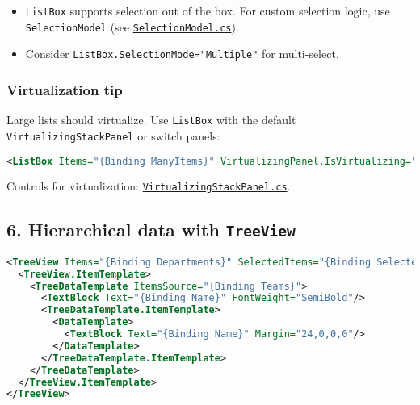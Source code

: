 \begin{itemize}
\tightlist
\item
  \passthrough{\lstinline!ListBox!} supports selection out of the box.
  For custom selection logic, use
  \passthrough{\lstinline!SelectionModel!} (see
  \href{https://github.com/AvaloniaUI/Avalonia/blob/master/src/Avalonia.Controls/Selection/SelectionModel.cs}{\passthrough{\lstinline!SelectionModel.cs!}}).
\item
  Consider \passthrough{\lstinline!ListBox.SelectionMode="Multiple"!}
  for multi-select.
\end{itemize}

\subsubsection{Virtualization tip}\label{virtualization-tip}

Large lists should virtualize. Use \passthrough{\lstinline!ListBox!}
with the default \passthrough{\lstinline!VirtualizingStackPanel!} or
switch panels:

\begin{lstlisting}[language=XML]
<ListBox Items="{Binding ManyItems}" VirtualizingPanel.IsVirtualizing="True" VirtualizingPanel.CacheLength="2"/>
\end{lstlisting}

Controls for virtualization:
\href{https://github.com/AvaloniaUI/Avalonia/blob/master/src/Avalonia.Controls/VirtualizingStackPanel.cs}{\passthrough{\lstinline!VirtualizingStackPanel.cs!}}.

\subsection{\texorpdfstring{6. Hierarchical data with
\texttt{TreeView}}{6. Hierarchical data with TreeView}}\label{hierarchical-data-with-treeview}

\begin{lstlisting}[language=XML]
<TreeView Items="{Binding Departments}" SelectedItems="{Binding SelectedDepartments}">
  <TreeView.ItemTemplate>
    <TreeDataTemplate ItemsSource="{Binding Teams}">
      <TextBlock Text="{Binding Name}" FontWeight="SemiBold"/>
      <TreeDataTemplate.ItemTemplate>
        <DataTemplate>
          <TextBlock Text="{Binding Name}" Margin="24,0,0,0"/>
        </DataTemplate>
      </TreeDataTemplate.ItemTemplate>
    </TreeDataTemplate>
  </TreeView.ItemTemplate>
</TreeView>
\end{lstlisting}

